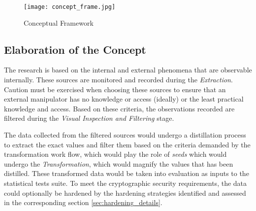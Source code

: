 \begin{figure}[h!]
    \texttt{[image: concept\_frame.jpg]}
    \centering
    \caption{Conceptual Framework}
    \label{fig:concept_frame}
\end{figure}

\subsection{Elaboration of the Concept}

The research is based on the internal and external phenomena that are observable internally. These sources are monitored and recorded during the \textit{Extraction}. Caution must be exercised when choosing these sources to ensure that an external manipulator has no knowledge or access (ideally) or the least practical knowledge and access. Based on these criteria, the observations recorded are filtered during the \textit{Visual Inspection and Filtering} stage.

The data collected from the filtered sources would undergo a distillation process to extract the exact values and filter them based on the criteria demanded by the transformation work flow, which would play the role of \textit{seeds} which would undergo the \textit{Transformation}, which would magnify the values that has been distilled. These transformed data would be taken into evaluation as inputs to the statistical tests suite. To meet the cryptographic security requirements, the data could optionally be hardened by the hardening strategies identified and assessed in the corresponding section \ref{sec:hardening_details}.